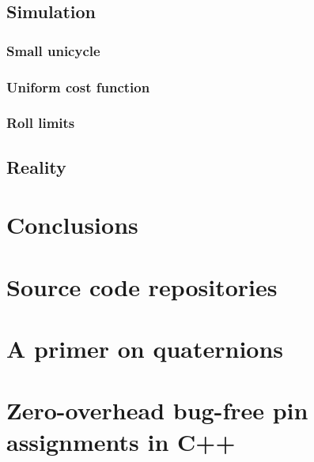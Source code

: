 \documentclass[12pt,a4paper]{IIBproject}
\begin{document}
		\section{Simulation}

			\subsection{Small unicycle}

			\subsection{Uniform cost function}

			\subsection{Roll limits}

		\section{Reality}

	\chapter{Conclusions}

	\printbibliography

	\appendix

	\chapter{Source code repositories}

	\chapter{A primer on quaternions}

	\chapter{Zero-overhead bug-free pin assignments in C++}
\end{document}
